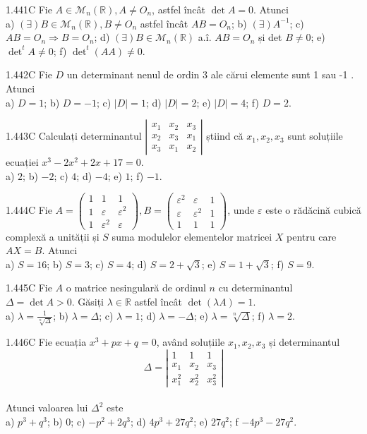 \documentclass[11pt]{article}
\begin{document}
1.441C Fie $A \in \mathcal{M}_{n}(\mathbb{R}), A \neq O_{n}$, astfel încât $\operatorname{det} A=0$. Atunci\\ a) $(\exists) B \in \mathcal{M}_{n}(\mathbb{R}), B \neq O_{n}$ astfel încât $A B=O_{n}$; b) $(\exists) A^{-1}$; c) $A B=O_{n} \Rightarrow B=O_{n}$; d) $(\exists) B \in \mathcal{M}_{n}(\mathbb{R})$ a.î. $A B=O_{n}$ și det $B \neq 0$; e) $\operatorname{det}^{t} A \neq 0$; f) $\operatorname{det}^{t}\left(A A\right) \neq 0$.

1.442C Fie $D$ un determinant nenul de ordin 3 ale cărui elemente sunt 1 sau -1 . Atunci\\ a) $D=1$; b) $D=-1$; c) $|D|=1$; d) $|D|=2$; e) $|D|=4$; f) $D=2$.

1.443C Calculați determinantul $\left|\begin{array}{lll}x_{1} & x_{2} & x_{3} \\ x_{2} & x_{3} & x_{1} \\ x_{3} & x_{1} & x_{2}\end{array}\right|$ știind că $x_{1}, x_{2}, x_{3}$ sunt soluțiile ecuației $x^{3}-2 x^{2}+2 x+17=0$.\\ a) $2$; b) $-2$; c) $4$; d) $-4$; e) $1$; f) $-1$.

1.444C Fie $A=\left(\begin{array}{lll}1 & 1 & 1 \\ 1 & \varepsilon & \varepsilon^{2} \\ 1 & \varepsilon^{2} & \varepsilon\end{array}\right), B=\left(\begin{array}{ccc}\varepsilon^{2} & \varepsilon & 1 \\ \varepsilon & \varepsilon^{2} & 1 \\ 1 & 1 & 1\end{array}\right)$, unde $\varepsilon$ este o rădăcină cubică complexă a unității și $S$ suma modulelor elementelor matricei $X$ pentru care $A X=B$. Atunci\\ a) $S=16$; b) $S=3$; c) $S=4$; d) $S=2+\sqrt{3}$; e) $S=1+\sqrt{3}$; f) $S=9$.

1.445C Fie $A$ o matrice nesingulară de ordinul $n$ cu determinantul $\Delta=\operatorname{det} A>0$. Găsiți $\lambda \in \mathbb{R}$ astfel încât $\operatorname{det}(\lambda A)=1$.\\ a) $\lambda=\frac{1}{\sqrt[n]{\Delta}}$; b) $\lambda=\Delta$; c) $\lambda=1$; d) $\lambda=-\Delta$; e) $\lambda=\sqrt[n]{\Delta}$; f) $\lambda=2$.

1.446C Fie ecuația $x^{3}+p x+q=0$, având soluțiile $x_{1}, x_{2}, x_{3}$ și determinantul $$\Delta=\left|\begin{array}{ccc}1 & 1 & 1 \\x_{1} & x_{2} & x_{3} \\x_{1}^{2} & x_{2}^{2} & x_{3}^{2}\end{array}\right|$$\\Atunci valoarea lui $\Delta^{2}$ este\\ a) $p^{3}+q^{3}$; b) $0$; c) $-p^{2}+2 q^{3}$; d) $4 p^{3}+27 q^{2}$; e) $27 q^{2}$; f $-4 p^{3}-27 q^{2}$.
\end{document}

